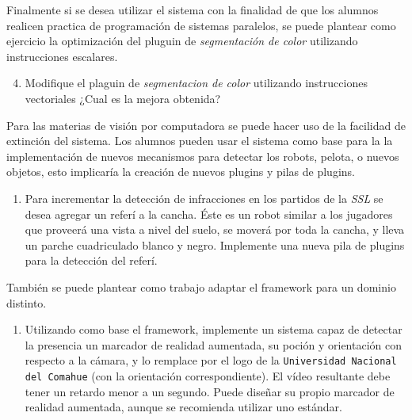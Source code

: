 Finalmente si se desea utilizar el sistema con la finalidad de que los alumnos
realicen practica de programación de sistemas paralelos, se puede plantear como
ejercicio la optimización del pluguin de \emph{segmentación de color} utilizando
instrucciones escalares.

\begin{enumerate}

	\setcounter{enumi}{3}

	\item{Modifique el plaguin de \emph{segmentacion de color} utilizando
	instrucciones vectoriales ¿Cual es la mejora obtenida?}

\end{enumerate}

Para las materias de visión por computadora se puede hacer uso de la facilidad
de extinción del sistema. Los alumnos pueden usar el sistema como base para la
la implementación de nuevos mecanismos para detectar los robots, pelota, o
nuevos objetos, esto implicaría la creación de nuevos plugins y pilas de
plugins.

\begin{enumerate}

	\item{Para incrementar la detección de infracciones en los partidos de
		la \emph{SSL} se desea agregar un referí a la cancha. Éste es un
		robot similar a los jugadores que proveerá una vista a nivel del
		suelo, se moverá por toda la cancha, y lleva un parche
		cuadriculado blanco y negro. Implemente una nueva pila de
		plugins para la detección del referí.}

\end{enumerate}

También se puede plantear como trabajo adaptar el framework para un dominio
distinto.

\begin{enumerate}

	\item{Utilizando como base el framework, implemente un sistema capaz de
		detectar la presencia un marcador de realidad aumentada, su
		poción y orientación con respecto a la cámara, y lo remplace por
		el logo de la \texttt{Universidad Nacional del Comahue} (con la
		orientación correspondiente). El vídeo resultante debe tener un
		retardo menor a un segundo. Puede diseñar su propio marcador de
		realidad aumentada, aunque se recomienda utilizar uno estándar.}

\end{enumerate}
